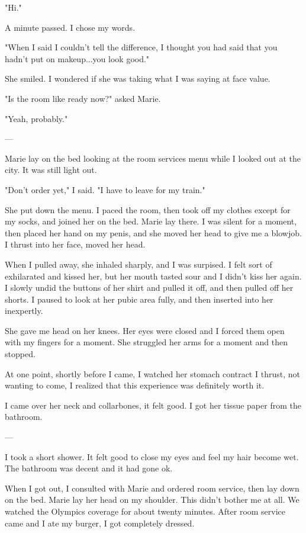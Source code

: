 \documentclass[12pt]{article}
\begin{document}
"Hi."

A minute passed.  I chose my words.

"When I said I couldn't tell the difference, I thought you had said that you
hadn't put on makeup...you look good."

She smiled.  I wondered if she was taking what I was saying at face value.

"Is the room like ready now?" asked Marie.

"Yeah, probably."

---

Marie lay on the bed looking at the room services menu while I looked out at the
city.  It was still light out.  

"Don't order yet," I said.  "I have to leave for my train."

She put down the menu.  I paced the room, then took off my clothes except for my
socks, and joined her on the bed.  Marie lay there.  I was silent for a moment,
then placed her hand on my penis, and she moved her head to give me a blowjob.
I thrust into her face, moved her head.

When I pulled away, she inhaled sharply, and I was surpised.  I felt sort of
exhilarated and kissed her, but her mouth tasted sour and I didn't kiss her
again.  I slowly undid the buttons of her shirt and pulled it off, and then
pulled off her shorts.  I paused to look at her pubic area fully, and then
inserted into her inexpertly.  

She gave me head on her knees.  Her eyes were closed and I forced them open with
my fingers for a moment.  She struggled her arms for a moment and then stopped.  

At one point, shortly before I came, I watched her stomach contract I thrust,
not wanting to come, I realized that this experience was definitely worth it.

I came over her neck and collarbones, it felt good.  I got her tissue paper from
the bathroom.

---

I took a short shower.  It felt good to close my eyes and feel my hair become
wet.  The bathroom was decent and it had gone ok.

When I got out, I consulted with Marie and ordered room service, then lay down
on the bed.  Marie lay her head on my shoulder.  This didn't bother me at all.
We watched the Olympics coverage for about twenty minutes.  After room service
came and I ate my burger, I got completely dressed.  
\end{document}
